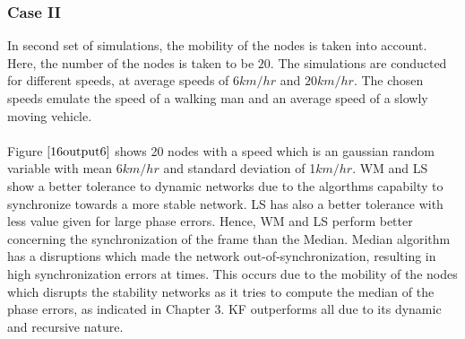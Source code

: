 \documentclass[a4paper,10pt]{report}
\begin{document}
\subsubsection{\textbf{Case II}}
In second set of simulations, the mobility of the nodes is taken
into account. Here, the number of the nodes is taken to be $20$. The
simulations are conducted for different speeds, at average speeds of
$6km/hr$ and $20km/hr$. The chosen speeds emulate the speed of a
walking man and an average speed of a slowly moving vehicle.
\paragraph*{}
Figure $\ref{16output6}$ shows 20 nodes with a speed which is an
gaussian random variable with mean $6km/hr$ and standard deviation
of 1$km/hr$. WM and LS show a better tolerance to dynamic networks
due to the algorthms capabilty to synchronize towards a more stable
network. LS has also a better tolerance with less value given for
large phase errors. Hence, WM and LS perform better concerning the
synchronization of the frame than the Median.  Median algorithm has
a disruptions which made the network out-of-synchronization,
resulting in high synchronization errors at times. This occurs due
to the mobility of the nodes which disrupts the stability networks
as it tries to compute the median of the phase errors, as indicated
in Chapter 3. KF outperforms all due to its dynamic and recursive nature.
\end{document}
